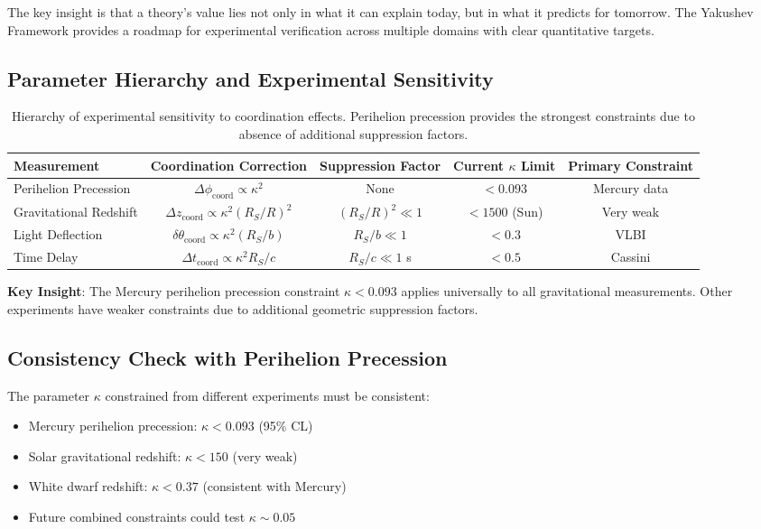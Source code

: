 \documentclass[11pt,a4paper]{article}
\begin{document}
	The key insight is that a theory's value lies not only in what it can explain today, but in what it predicts for tomorrow. The Yakushev Framework provides a roadmap for experimental verification across multiple domains with clear quantitative targets.
	\subsection{Parameter Hierarchy and Experimental Sensitivity}
	
	\begin{table}[htbp]
		\centering
		\scriptsize
		\begin{tabular}{lcccc}
			\toprule
			\textbf{Measurement} & \textbf{Coordination Correction} & \textbf{Suppression Factor} & \textbf{Current $\kappa$ Limit} & \textbf{Primary Constraint} \\
			\midrule
Perihelion Precession & $\Delta\phi_{\text{coord}} \propto \kappa^2$ & None & $<0.093$ & Mercury data \\
			Gravitational Redshift & $\Delta z_{\text{coord}} \propto \kappa^2(R_S/R)^2$ & $(R_S/R)^2 \ll 1$ & $<1500$ (Sun) & Very weak \\
			Light Deflection & $\delta\theta_{\text{coord}} \propto \kappa^2(R_S/b)$ & $R_S/b \ll 1$ & $<0.3$ & VLBI \\
			Time Delay & $\Delta t_{\text{coord}} \propto \kappa^2 R_S/c$ & $R_S/c \ll 1$ s & $<0.5$ & Cassini \\
			\bottomrule
		\end{tabular}
		\caption{Hierarchy of experimental sensitivity to coordination effects. Perihelion precession provides the strongest constraints due to absence of additional suppression factors.}
		\label{tab:sensitivity-hierarchy}
	\end{table}
	
	\textbf{Key Insight}: The Mercury perihelion precession constraint $\kappa < 0.093$ applies universally to all gravitational measurements. Other experiments have weaker constraints due to additional geometric suppression factors.
	\subsection{Consistency Check with Perihelion Precession}
	
	The parameter $\kappa$ constrained from different experiments must be consistent:
	\begin{itemize}
		\item Mercury perihelion precession: $\kappa < 0.093$ (95\% CL)
		\item Solar gravitational redshift: $\kappa < 150$ (very weak)
		\item White dwarf redshift: $\kappa < 0.37$ (consistent with Mercury)
		\item Future combined constraints could test $\kappa \sim 0.05$
	\end{itemize}
	
\end{document}
